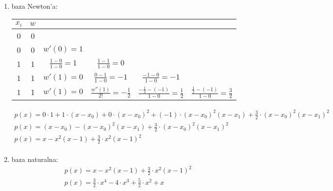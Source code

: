 \documentclass[a4paper]{article}
\begin{document}
      \begin{enumerate}[label=(\alph*)]
         \item
            baza Newton'a: \\
            \begin{tabular}{ c | c c c c c }
               $x_{i}$ & $w$ \\
               \hline
               0 & 0 \\
               0 & 0    & $w'(0) = 1$ \\
               \hline
               1 & 1    & $\frac{1 - 0}{1 - 0} = 1$
                        & $\frac{1 - 1}{1 - 0} = 0$ \\
               1 & 1    & $w'(1) = 0$
                        & $\frac{0 - 1}{1 - 0} = -1$
                        & $\frac{-1 - 0}{1 - 0} = -1$ \\
               1 & 1    & $w'(1) = 0$
                        & $\frac{w''(1)}{2!} = -\frac{1}{2}$
                        & $\frac{-\frac{1}{2} - (-1)}{1 - 0} = \frac{1}{2}$
                        & $\frac{\frac{1}{2} - (-1)}{1 - 0} = \frac{3}{2}$ \\
            \end{tabular}

            \begin{gather*}
                p(x) =
                  0 \cdot 1 +
                  1 \cdot (x - x_{0}) +
                  0 \cdot (x - x_{0})^{2} +
                  (-1) \cdot (x - x_{0})^{2} (x - x_{1}) +
                  \frac{3}{2} \cdot (x - x_{0})^{2} (x - x_{1})^{2} \\
                p(x) =
                  (x - x_{0}) -
                  (x - x_{0})^{2} (x - x_{1}) +
                  \frac{3}{2} \cdot (x - x_{0})^{2} (x - x_{1})^{2} \\
                p(x) =
                   x -
                   x^{2} (x - 1) +
                   \frac{3}{2} \cdot x^{2} (x - 1)^{2} \\
            \end{gather*}

         \item
            baza naturalna:
            \begin{gather*}
               p(x) =
                  x -
                  x^2 (x - 1) +
                  \frac{3}{2} \cdot x^{2} (x - 1)^2 \\
               p(x) =
                  \frac{3}{2} \cdot x^{4} -
                  4 \cdot x^{3} +
                  \frac{5}{2} \cdot x^{2} +
                  x
            \end{gather*}
      \end{enumerate}
\end{document}
